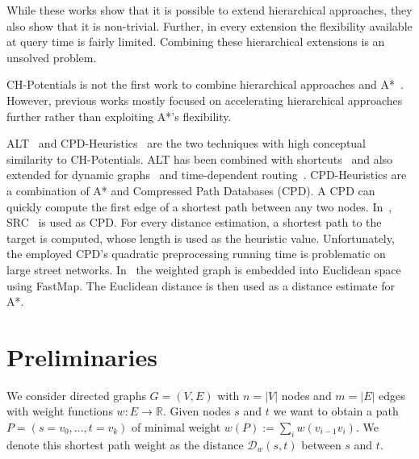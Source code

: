 \documentclass[manuscript,review]{acmart}
\newcommand*{\dist}{\mathcal{D}}
\begin{document}
While these works show that it is possible to extend hierarchical approaches, they also show that it is non-trivial.
Further, in every extension the flexibility available at query time is fairly limited.
Combining these hierarchical extensions is an unsolved problem.

CH-Potentials is not the first work to combine hierarchical approaches and A*~\cite{bdsssw-chgds-10,gkw-blwr-07,bdgwz-sfpcs-19}.
However, previous works mostly focused on accelerating hierarchical approaches further rather than exploiting A*'s flexibility.

ALT~\cite{gh-cspas-05,gw-cppsp-05} and CPD-Heuristics~\cite{DBLP:conf/ijcai/BonoGHS19} are the two techniques with high conceptual similarity to CH-Potentials.
ALT has been combined with shortcuts~\cite{bdsssw-chgds-10} and also extended for dynamic graphs~\cite{dw-lbrdg-07} and time-dependent routing~\cite{ndls-bastd-12,dn-crdtd-12}.
%
CPD-Heuristics are a combination of A* and Compressed Path Databases (CPD).
A CPD can quickly compute the first edge of a shortest path between any two nodes.
In~\cite{DBLP:conf/ijcai/BonoGHS19}, SRC~\cite{DBLP:conf/socs/StrasserHB14} is used as CPD.
For every distance estimation, a shortest path to the target is computed, whose length is used as the heuristic value.
Unfortunately, the employed CPD's quadratic preprocessing running time is problematic on large street networks.
%
%
In~\cite{DBLP:conf/ijcai/0002UJAKK18} the weighted graph is embedded into Euclidean space using FastMap. %
The Euclidean distance is then used as a distance estimate for A*.


\section{Preliminaries}\label{sec:preliminaries}

We consider directed graphs $G=(V,E)$ with $n=|V|$ nodes and $m=|E|$ edges with weight functions $w : E \to \mathbb{R}$.
Given nodes $s$ and $t$ we want to obtain a path $P=(s=v_0,\dots,t=v_k)$ of minimal weight $w(P) := \sum_{i} w(v_{i-1}v_i)$.
We denote this shortest path weight as the distance $\dist_w(s,t)$ between $s$ and $t$.
\end{document}
